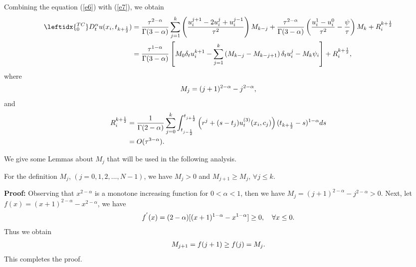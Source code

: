 \documentclass[3p,times]{elsarticle}
\begin{document}
Combining the equation (\ref{e6}) with (\ref{e7}), we obtain
\begin{equation}\label{e9}
\aligned
\leftidx{_0^{TC}}D_t^{\alpha}u(x_i,t_{k+\frac{1}{2}})
&=\frac{\tau^{2-\alpha}}{\Gamma(3-\alpha)}\sum\limits_{j=1}^k\left(\frac{u_i^{j+1}-2u_i^j+u_i^{j-1}}{\tau^2}\right)M_{k-j}
+\frac{\tau^{2-\alpha}}{\Gamma(3-\alpha)}\left(\frac{u_i^{1}-u_i^0}{\tau^2}-\frac{\psi}{\tau}\right)M_k+R_i^{k+\frac{1}{2}}\\
&=\frac{\tau^{1-\alpha}}{\Gamma(3-\alpha)}\left[M_0\delta_tu_i^{k+1}-\sum\limits_{j=1}^k\left(M_{k-j}-M_{k-j+1}\right)\delta_tu_i^j-M_k\psi_i\right]+R_i^{k+\frac{1}{2}},
\endaligned
\end{equation}
where
\begin{equation}\label{e10}
\aligned
M_j=(j+1)^{2-\alpha}-j^{2-\alpha},
\endaligned
\end{equation}
and
\begin{equation}\label{e11}
\aligned
R_i^{k+\frac{1}{2}}&=\frac{1}{\Gamma(2-\alpha)}\sum\limits_{j=0}^k\int_{t_{j-\frac{1}{2}}}^{t_{j+\frac{1}{2}}}\left(r^j+(s-t_{j})u^{(3)}_{t}(x_i,c_j)\right)(t_{k+\frac{1}{2}}-s)^{1-\alpha}ds\\
&=O(\tau^{3-\alpha}).
\endaligned
\end{equation}

We give some Lemmas about $M_j$ that will be used in the following analysis.
\begin{lem}\label{le4}
For the definition $M_j$, $(j=0,1,2,\ldots,N-1)$, we have $M_j>0$ and $M_{j+1}\geq M_j$, $\forall j\leq k$.
\end{lem}
\textbf{Proof:} Observing that $x^{2-\alpha}$ is a monotone increasing function for $0<\alpha<1$, then we have $M_j=(j+1)^{2-\alpha}-j^{2-\alpha}>0$. Next, let $f(x)=(x+1)^{2-\alpha}-x^{2-\alpha}$, we have
\begin{equation*}
\aligned
f^{'}(x)=(2-\alpha)[(x+1)^{1-\alpha}-x^{1-\alpha}]\geq0, \quad\forall x\leq0.
\endaligned
\end{equation*}
Thus we obtain
\begin{equation*}
\aligned
M_{j+1}=f(j+1)\geq f(j)=M_j.
\endaligned
\end{equation*}
This completes the proof.
\end{document}
